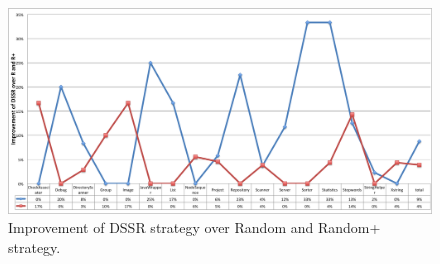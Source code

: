 \documentclass{acm_proc_article-sp}
\begin{document}
\begin{figure}[ht]
\centering
\includegraphics[width=18cm]{DssrImprove.png}
\caption{Improvement of DSSR strategy over Random and Random+ strategy.}
\label{fig:LineChart}
\end{figure}

\end{document}
